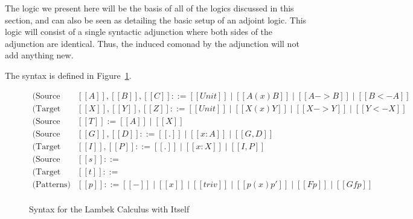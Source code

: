 The logic we present here will be the basis of all of the logics
discussed in this section, and can also be seen as detailing the basic
setup of an adjoint logic.  This logic will consist of a single
syntactic adjunction where both sides of the adjunction are identical.
Thus, the induced comonad by the adjunction will not add anything new.

The syntax is defined in Figure~\ref{fig:LC-with-LC:syntax}.
\begin{figure}
  \begin{mdframed}
    \[
    \begin{array}{lll}
      \text{(Source Formulas)} & [[A]],[[B]],[[C]] ::= [[Unit]] \mid [[A (x) B]] \mid [[A -> B]] \mid [[B <- A]]\\
      \text{(Target Formulas)} & [[X]],[[Y]],[[Z]] ::= [[Unit]] \mid [[X (x) Y]] \mid [[X -> Y]] \mid [[Y <- X]]\\
      \text{(Source and Target)} & [[T]] := [[A]] \mid [[X]]\\
      \text{(Source Contexts)} & [[G]],[[D]] ::= [[.]] \mid [[x : A]] \mid [[G,D]]\\
      \text{(Target Contexts)} & [[I]],[[P]] ::= [[.]] \mid [[x : X]] \mid [[I,P]]\\      
      \text{(Source Terms)}    & [[s]] ::= \\
      \text{(Target Terms)}    & [[t]] ::= \\
      \text{(Patterns)}        & [[p]] ::= [[-]] \mid [[x]] \mid [[triv]] \mid [[p (x) p']] \mid [[F p]] \mid [[Gf p]]\\
    \end{array}
    \]
  \end{mdframed}
  \caption{Syntax for the Lambek Calculus with Itself}
  \label{fig:LC-with-LC:syntax}
\end{figure}
